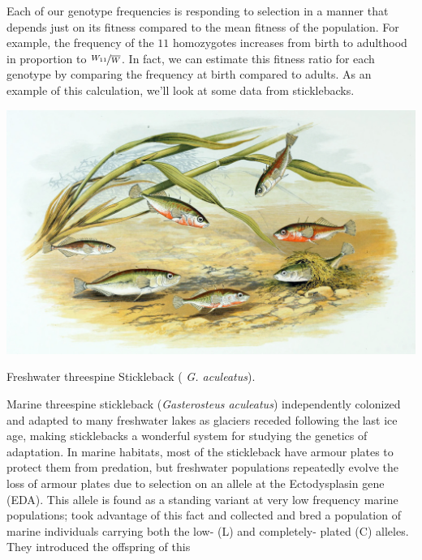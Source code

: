 Each of our genotype frequencies is responding to selection in a
manner that depends just on its fitness compared to the mean fitness
of the population. For example, the frequency of the $11$ homozygotes
increases from birth to adulthood in proportion to $\nicefrac{W_{11}}{\overline{W}}$. In
fact, we can estimate this fitness ratio for each genotype by comparing
the frequency at birth compared to adults. As an example of this calculation, we'll
look at some data from sticklebacks. 
\begin{marginfigure}
\begin{center}
\includegraphics[width= 1.2 \textwidth]{illustration_images/single_locus_selection/Stickleback/Gasterosteus_aculeatus_1879.jpg}
\end{center}
\caption{Freshwater threespine Stickleback ({\it
    G. aculeatus}). } \label{fig:stickleback}
\end{marginfigure}
Marine threespine stickleback ({\it Gasterosteus aculeatus})
independently colonized and adapted to many freshwater lakes
as glaciers receded following the last ice age, making sticklebacks a wonderful system for studying the genetics of adaptation. In marine habitats, most of the stickleback have armour plates to protect them
from predation, but freshwater populations repeatedly evolve the
loss of armour plates due to selection on an allele at the
Ectodysplasin gene (EDA).  This allele is found as a standing variant at very low frequency marine populations;
\citeauthor{Barrett:08} took advantage of this fact and collected and bred
a population of marine individuals carrying both the low- (L) and
completely- plated (C) alleles. They introduced the offspring of this
